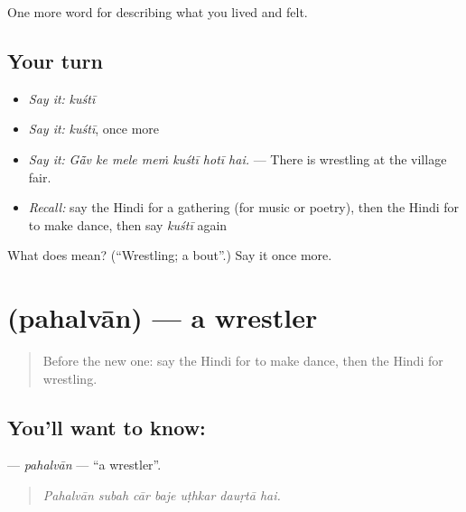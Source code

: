 \begin{grammarlens}[title={What you've built}]
One more word for describing what you lived and felt.
\end{grammarlens}

\subsection*{Your turn}
\begin{itemize}
\raggedright
  \item \emph{Say it:} \emph{kuśtī}
  \item \emph{Say it:} \emph{kuśtī}, once more
  \item \emph{Say it:} \emph{Gā̃v ke mele meṁ kuśtī hotī hai.} — There is wrestling at the village fair.
  \item \emph{Recall:} say the Hindi for a gathering (for music or poetry), then the Hindi for to make dance, then say \emph{kuśtī} again
\end{itemize}

\begin{tcolorbox}[breakable,colback=teal!4,colframe=teal!35!black,title={Before you move on}]
What does  mean? (\textquotedblleft{}Wrestling; a bout\textquotedblright{}.) Say it once more.
\end{tcolorbox}
\section[\texorpdfstring{\hi{पहलवान} (pahalvān)}{पहलवान (pahalvān)}]{ (pahalvān) — a wrestler}

\label{lesson:HI-C533-pahalvan}



\begin{quote}
Before the new one: say the Hindi for to make dance, then the Hindi for wrestling.
\end{quote}

\subsection*{You'll want to know: }
\textbf{} — \emph{pahalvān} — \textquotedblleft{}a wrestler\textquotedblright{}.

\begin{quote}
      
\end{quote}

\begin{quote}
\emph{Pahalvān subah cār baje uṭhkar dauṛtā hai.}
\end{quote}


